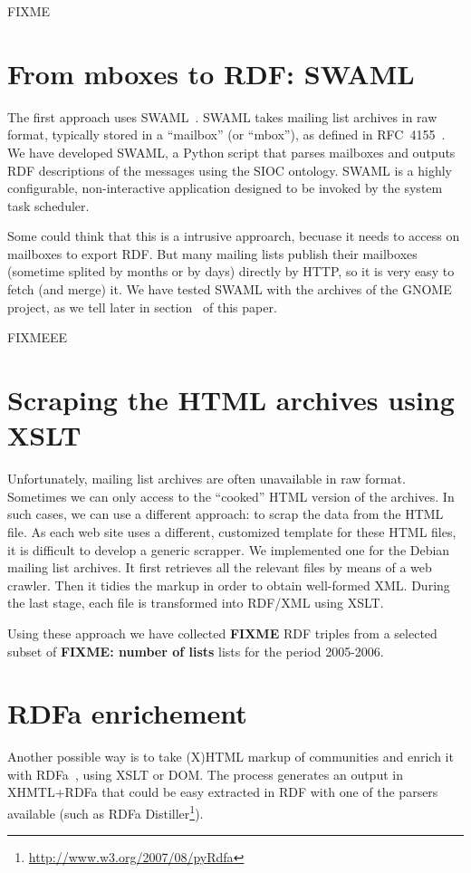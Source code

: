 \documentclass{../templates/www2008-submission}
\begin{document}
FIXME

\section{From mboxes to RDF: SWAML}

The first approach uses SWAML~\cite{SWAML2007}. SWAML takes mailing 
list archives in raw format, typically stored in a ``mailbox'' 
(or ``mbox''), as defined in RFC~4155~\cite{RFC4155}. We have 
developed SWAML, a Python script that parses mailboxes and 
outputs RDF descriptions of the messages using the SIOC ontology.
SWAML is a highly configurable, non-interactive application designed 
to be invoked by the system task scheduler.

Some could think that this is a intrusive approarch, becuase it needs
to access on mailboxes to export RDF. But many mailing lists publish
their mailboxes (sometime splited by months or by days) directly by 
HTTP, so it is very easy to fetch (and merge) it. We have tested SWAML 
with the archives of the GNOME project, as we tell later in 
section~\label{sec:gnome} of this paper. 

FIXMEEE	

\section{Scraping the HTML archives using XSLT}

Unfortunately, mailing list archives are often unavailable in raw
format. Sometimes we can only access to the ``cooked'' HTML
version of the archives. In such cases, we can use a different
approach: to scrap the data from the HTML file. As each web site
uses a different, customized template for these HTML files, it is
difficult to develop a generic scrapper. We implemented one
for the Debian mailing list archives. It first retrieves all
the relevant files by means of a web crawler. Then it tidies the
markup in order to obtain well-formed XML. During the last stage,
each file is transformed into RDF/XML using XSLT.

Using these approach we have collected \textbf{FIXME} RDF triples
from a selected subset of \textbf{FIXME: number of lists} lists for
the period 2005-2006.

\section{RDFa enrichement}

Another possible way is to take (X)HTML markup of communities and
enrich it with RDFa~\cite{Birbeck2006}, using XSLT or DOM. The process
generates an output in XHMTL+RDFa that could be easy extracted in RDF 
with one of the parsers available (such as RDFa Distiller\footnote{\url{http://www.w3.org/2007/08/pyRdfa}}).
\end{document}
